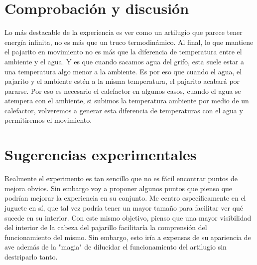 \section{Comprobación y discusión}
    Lo más destacable de la experiencia es ver como un artilugio que parece tener energía infinita, no es más que un truco termodinámico. Al final, lo que mantiene el pajarito en movimiento no es más que la diferencia de temperatura entre el ambiente y el agua. Y es que cuando sacamos agua del grifo, esta suele estar a una temperatura algo menor a la ambiente. Es por eso que cuando el agua, el pajarito y el ambiente estén a la misma temperatura, el pajarito acabará por pararse. Por eso es necesario el calefactor en algunos casos, cuando el agua se atempera con el ambiente, si subimos la temperatura ambiente por medio de un calefactor, volveremos a generar esta diferencia de temperaturas con el agua y permitiremos el movimiento.
\section{Sugerencias experimentales}
    Realmente el experimento es tan sencillo que no es fácil encontrar puntos de mejora obvios. Sin embargo voy a proponer algunos puntos que pienso que podrían mejorar la experiencia en su conjunto. Me centro específicamente en el juguete en sí, que tal vez podría tener un mayor tamaño para facilitar ver qué sucede en su interior. Con este mismo objetivo, pienso que una mayor visibilidad del interior de la cabeza del pajarillo facilitaría la comprensión del funcionamiento del mismo. Sin embargo, esto iría a expensas de su apariencia de ave además de la "magia" de dilucidar el funcionamiento del artilugio sin destriparlo tanto.